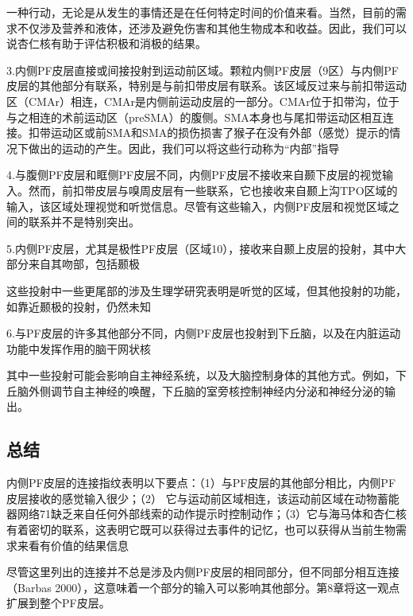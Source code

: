 一种行动，无论是从发生的事情还是在任何特定时间的价值来看。当然，目前的需求不仅涉及营养和液体，还涉及避免伤害和其他生物成本和收益。因此，我们可以说杏仁核有助于评估积极和消极的结果。\par
3.内侧PF皮层直接或间接投射到运动前区域。颗粒内侧PF皮层（9区）与内侧PF皮层的其他部分有联系，特别是与前扣带皮层有联系\cite{Vogt&Pandya 1987}。该区域反过来与前扣带运动区（CMAr）相连，CMAr是内侧前运动皮层的一部分\cite{Morecraft&VanHoesen,1998}。CMAr位于扣带沟\cite{Dum&Strick,2002}，位于与之相连的术前运动区（preSMA）的腹侧\cite{Luppino et al.1993}。SMA本身也与尾扣带运动区相互连接\cite{Luppino et al.1993}。扣带运动区或前SMA和SMA的损伤损害了猴子在没有外部（感觉）提示的情况下做出的运动的产生\cite{Thaler et al.1995}。因此，我们可以将这些行动称为“内部”指导\par
4.与腹侧PF皮层和眶侧PF皮层不同，内侧PF皮层不接收来自颞下皮层的视觉输入\cite{Carmichael&Price 1995b;Kondo et al.2005}。然而，前扣带皮层与嗅周皮层有一些联系，它也接收来自颞上沟TPO区域的输入\cite{Kondo et al.2005}，该区域处理视觉和听觉信息。尽管有这些输入，内侧PF皮层和视觉区域之间的联系并不是特别突出。\par
5.内侧PF皮层，尤其是极性PF皮层（区域10），接收来自颞上皮层的投射，其中大部分来自其吻部，包括颞极\cite{Barbas et al.1999;Kondo et al.2003}\par
这些投射中一些更尾部的涉及生理学研究表明是听觉的区域\cite{Hackett et al 1998}，但其他投射的功能，如靠近颞极的投射，仍然未知\par
6.与PF皮层的许多其他部分不同，内侧PF皮层也投射到下丘脑\cite{Rempel-Clower&Barbas,1998}，以及在内脏运动功能中发挥作用的脑干网状核\cite{Öngür et al.1998;Barbas et al.2003}\par
其中一些投射可能会影响自主神经系统，以及大脑控制身体的其他方式。例如，下丘脑外侧调节自主神经的唤醒，下丘脑的室旁核控制神经内分泌和神经分泌的输出。\par
\subsection{总结}
内侧PF皮层的连接指纹表明以下要点：（1）与PF皮层的其他部分相比，内侧PF皮层接收的感觉输入很少；（2） 它与运动前区域相连，该运动前区域在动物蓄能器网络71缺乏来自任何外部线索的动作提示时控制动作；（3）它与海马体和杏仁核有着密切的联系，这表明它既可以获得过去事件的记忆，也可以获得从当前生物需求来看有价值的结果信息\par
尽管这里列出的连接并不总是涉及内侧PF皮层的相同部分，但不同部分相互连接（Barbas 2000），这意味着一个部分的输入可以影响其他部分。第8章将这一观点扩展到整个PF皮层。\par
